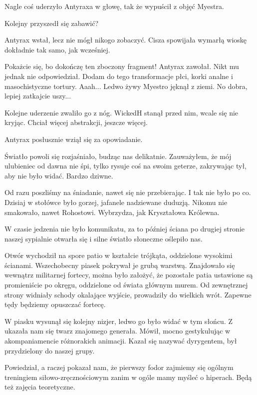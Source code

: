 \divider{}

Nagle coś uderzyło Antyraxa w głowę, tak że wypuścił z objęć Myestra.

Kolejny przyszedł się zabawić?

Antyrax wstał, lecz nie mógł nikogo zobaczyć.
Cisza spowijała wymarłą wioskę dokładnie tak samo, jak wcześniej.

\begin{dialogue}
\ds{} Pokażcie się, bo dokończę ten zboczony fragment! \dm{} Antyrax zawołał. Nikt mu jednak nie odpowiedział. \dm{} Dodam do tego transformacje płci, korki analne i masochistyczne tortury.
\ds{} Aaah... \dm{} Ledwo żywy Myestro jęknął z ziemi.
\ds{} No dobra, lepiej zatkajcie uszy...
\end{dialogue}

Kolejne uderzenie zwaliło go z nóg. 
WickedH stanął przed nim, wcale się nie kryjąc.
Chciał więcej abstrakcji, jeszcze więcej.

Antyrax posłusznie wziął się za opowiadanie.

\divider{}

Światło powoli się rozjaśniało, budząc nas delikatnie.
Zauważyłem, że mój ulubieniec od dawna nie śpi, tylko rysuje coś na swoim geterze, zakrywając tył, aby nie było widać.
Bardzo dziwne.

Od razu poszliśmy na śniadanie, nawet się nie przebierając. I tak nie było po co.
Dzisiaj w stołówce było gorzej, jafanele nadziewane duduzją.
Nikomu nie smakowało, nawet Rohostowi. Wybrzydza, jak Kryształowa Królewna.

W czasie jedzenia nie było komunikatu, za to później ściana po drugiej stronie naszej sypialnie otwarła się i silne światło słoneczne oślepiło nas.

Otwór wychodził na spore patio w kształcie trójkąta, oddzielone wysokimi ścianami.
Wszechobecny piasek pokrywał je grubą warstwą.
Znajdowało się wewnątrz militarnej fortecy, można było założyć, że pozostałe patia ustawione są promieniście po okręgu, oddzielone od świata głównym murem.
Od zewnętrznej strony widniały schody okalające wyjście, prowadziły do wielkich wrót.
Zapewne tędy będziemy opuszczać fortecę.

W piasku wysunął się kolejny nizjer, ledwo go było widać w tym słońcu.
Z ukazała nam się twarz znajomego generała.
Mówił, mocno gestykulując w akompaniamencie różnorakich animacji.
Kazał się nazywać dyrygentem, był przydzielony do naszej grupy.

Powiedział, a raczej pokazał nam, że pierwszy fodor zajmiemy się ogólnym treningiem siłowo-zręcznościowym zanim w ogóle mamy myśleć o hiperach.
Będą też zajęcia teoretyczne.

